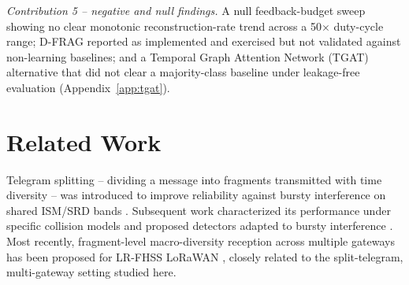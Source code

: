 \documentclass[journal]{IEEEtran}
\begin{document}
\textit{Contribution 5 -- negative and null findings.} A null feedback-budget sweep showing no clear monotonic reconstruction-rate trend across a 50$\times$ duty-cycle range; D-FRAG reported as implemented and exercised but not validated against non-learning baselines; and a Temporal Graph Attention Network (TGAT) alternative that did not clear a majority-class baseline under leakage-free evaluation (Appendix~\ref{app:tgat}).

\section{Related Work}

Telegram splitting -- dividing a message into fragments transmitted with time diversity -- was introduced to improve reliability against bursty interference on shared ISM/SRD bands \cite{ts2014, ts2015}. Subsequent work characterized its performance under specific collision models \cite{ts2016} and proposed detectors adapted to bursty interference \cite{ts2020}. Most recently, fragment-level macro-diversity reception across multiple gateways has been proposed for LR-FHSS LoRaWAN \cite{ts2025}, closely related to the split-telegram, multi-gateway setting studied here.
\end{document}

